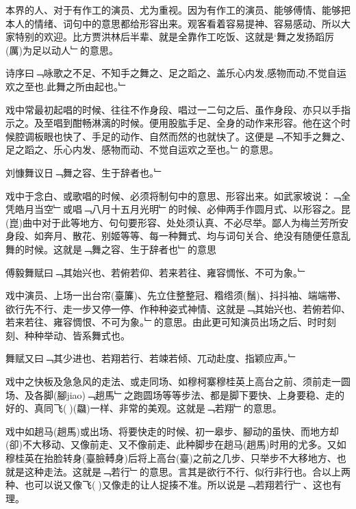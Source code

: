 \documentclass{zhvt-classic}
\begin{document}
本界的人、对于有作工的演员、尤为重视。因为有作工的演员、能够傅情、能够把本人的情绪、词句中的意思都给形容出来。观客看着容易提神、容易感动、所以大家特别的欢迎。比方贾洪林后半辈、就是全靠作工吃饭、这就是‘舞之发扬蹈厉(厲)为足以动人﹂的意思。

\begin{preface}
  诗序曰﹁咏歌之不足、不知手之舞之、足之蹈之、盖乐心内发,感物而动,不觉自运欢之至也.此舞之所由起也。﹂
\end{preface}

戏中常最初起唱的时候、往往不作身段、唱过一二句之后、虽作身段、亦只以手指示之。及至唱到酣畅淋漓的时候。便用股肱手足、全身的动作来形容。他在这个时候腔调板眼也快了、手足的动作、自然而然的也就快了。这便是﹁不知手之舞之、足之蹈之、乐心内发、感物而动、不觉自运欢之至也。﹂的意思。

\begin{preface}
  刘慷舞议日﹁舞之容、生于辞者也。﹂
\end{preface}

戏中于念白、或歌唱的时候、必须将制句中的意思、形容出来。如武家坡说：﹁全凭皓月当空﹂或唱﹁八月十五月光明﹂的时候、必伸两手作圆月式、以形容之。昆(崑)曲中对于此等地方、句句要形容、处处须认真、不必尽举。鄙人为梅兰芳所安身段、如奔月、散花、别姬等等、每一种舞式、均与词句关合、绝没有随便任意乱舞的时候。这就是﹁舞之容、生于辞者也﹂的意思

\begin{preface}
  傅毅舞赋曰﹁其始兴也、若俯若仰、若来若往、雍容惆怅、不可为象。﹂
\end{preface}

戏中演员、上场一出台帘(臺簾)、先立住整整冠、糌绺须(鬚)、抖抖袖、端端帯、欲行先不行、走一步又停一停、作种种姿式神情、这就是﹁其始兴也、若俯若仰、若来若往、雍容惆恨、不可为象。﹂的意思。由此更可知演员出场之后、时时刻刻、种种举动、皆系舞式也。

\begin{preface}
  舞赋又曰﹁其少进也、若翔若行、若竦若倾、兀动赴度、指颖应声。﹂
\end{preface}


戏中之快板及急急风的走法、或走同场、如穆柯寨穆桂英上高台之前、须前走一圆场、及各脚(腳jiao)﹁趟馬﹂之跑圆场等等步法、都是脚下要快、上身要稳、走的好的、真同飞(𮸽)(飝)一样、非常的美观。这就是﹁若翔﹂的意思。

戏中如趟马(趟馬)或出场、将要快走的时候、初一皋步、腳动的虽快、而地方却(卻)不大移动、又像前走、又不像前走、此种脚步在趟马(趟馬)时用的尤多。又如穆桂英在抬脸转身(臺臉𨍭身)后将上高台(臺)之前之几步、只举步不大移地方、也就是这种走法。这就是﹁若行﹂的意思。言其是欲行不行、似行非行也。合以上两种、也可以说又像飞(𮸽)又像走的让人捉揍不准。所以说是﹁若翔若行﹂、这也有理。
\end{document}
